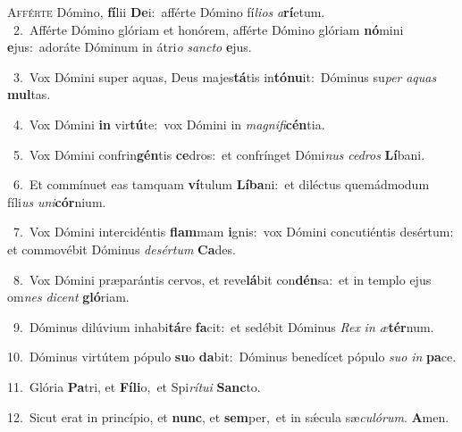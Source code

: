 \lettrine{\initial\textcolor{\initialcolor}{A}}{fférte} Dómino, \textbf{fí}\-lii \textbf{De}\-i:~\star afférte Dómino fí\-\textit{li}\-\textit{os} \textit{a}\-\textbf{rí}etum.\\
{\numbfont\textcolor{\numbcolor}{~2.}}~Afférte Dómino glóriam et honórem, afférte Dómino glóriam \textbf{nó}\-mini \textbf{e}\-jus:~\star adoráte Dóminum in átri\textit{o} \textit{sanc}\-\textit{to} \textbf{e}\-jus.\par
{\numbfont\textcolor{\numbcolor}{~3.}}~Vox Dómini super aquas, Deus majes\-\textbf{tá}\-tis in\-\textbf{tó}\-\textbf{nu}it:~\star Dóminus su\textit{per} \textit{a}\-\textit{quas} \textbf{mul}\-tas.\par
{\numbfont\textcolor{\numbcolor}{~4.}}~Vox Dómini \textbf{in} vir\-\textbf{tú}\-te:~\star vox Dómini in \textit{ma}\-\textit{gni}\textit{fi}\textbf{cén}tia.\par
{\numbfont\textcolor{\numbcolor}{~5.}}~Vox Dómini confrin\-\textbf{gén}\-tis \textbf{ce}\-dros:~\star et confrínget Dómi\textit{nus} \textit{ce}\-\textit{dros} \textbf{Lí}\-bani.\par
{\numbfont\textcolor{\numbcolor}{~6.}}~Et commínuet eas tamquam \textbf{ví}\-tulum \textbf{Lí}\-\textbf{ba}ni:~\star et diléctus quemádmodum fíli\textit{us} \textit{u}\-\textit{ni}\textbf{cór}nium.\par
{\numbfont\textcolor{\numbcolor}{~7.}}~Vox Dómini intercidéntis \textbf{flam}\-mam \textbf{i}\-gnis:~\star vox Dómini concutiéntis desértum: et commovébit Dóminus \textit{de}\-\textit{sér}\textit{tum} \textbf{Ca}\-des.\par
{\numbfont\textcolor{\numbcolor}{~8.}}~Vox Dómini præparántis cervos, et reve\-\textbf{lá}\-bit con\-\textbf{dén}\-sa:~\star et in templo ejus om\textit{nes} \textit{di}\-\textit{cent} \textbf{gló}\-riam.\par
{\numbfont\textcolor{\numbcolor}{~9.}}~Dóminus dilúvium inhabi\-\textbf{tá}\-re \textbf{fa}\-cit:~\star et sedébit Dóminus \textit{Rex} \textit{in} \textit{æ}\-\textbf{tér}num.\par
{\numbfont\textcolor{\numbcolor}{10.}}~Dóminus virtútem pópulo \textbf{su}\-o \textbf{da}\-bit:~\star Dóminus benedícet pópulo \textit{su}\-\textit{o} \textit{in} \textbf{pa}\-ce.\par
{\numbfont\textcolor{\numbcolor}{11.}}~Glória \textbf{Pa}\-tri, et \textbf{Fí}\-\textbf{li}o,~\star et Spi\-\textit{rí}\-\textit{tu}\textit{i} \textbf{Sanc}\-to.\par
{\numbfont\textcolor{\numbcolor}{12.}}~Sicut erat in princípio, et \textbf{nunc}\-, et \textbf{sem}\-per,~\star et in sǽcula sæ\-\textit{cu}\-\textit{ló}\textit{rum}. \textbf{A}\-men.\par
